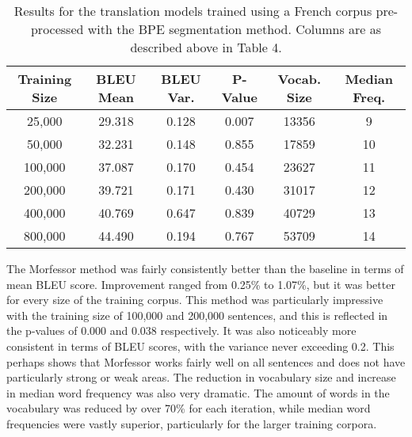 \documentclass[11pt]{article}
\begin{document}
\begin{table}[h]
\centering
\begin{tabular}{|c|c|c|c|c|c|}
\hline
Training Size & BLEU Mean & BLEU Var. & P-Value & Vocab. Size & Median Freq. \\ \hline
25,000        & 29.318    & 0.128     & 0.007   & 13356       & 9            \\
50,000        & 32.231    & 0.148     & 0.855   & 17859       & 10           \\
100,000       & 37.087    & 0.170     & 0.454   & 23627       & 11           \\
200,000       & 39.721    & 0.171     & 0.430   & 31017       & 12           \\
400,000       & 40.769    & 0.647     & 0.839   & 40729       & 13           \\
800,000       & 44.490    & 0.194     & 0.767   & 53709       & 14           \\ \hline
\end{tabular}
\caption{Results for the translation models trained using a French corpus pre-processed with the BPE segmentation method. Columns are as described above in Table 4.}
\label{tab:bpe}
\end{table}

The Morfessor method was fairly consistently better than the baseline in terms of mean BLEU score. Improvement ranged from 0.25\% to 1.07\%, but it was better for every size of the training corpus. This method was particularly impressive with the training size of 100,000 and 200,000 sentences, and this is reflected in the p-values of 0.000 and 0.038 respectively. It was also noticeably more consistent in terms of BLEU scores, with the variance never exceeding 0.2. This perhaps shows that Morfessor works fairly well on all sentences and does not have particularly strong or weak areas. The reduction in vocabulary size and increase in median word frequency was also very dramatic. The amount of words in the vocabulary was reduced by over 70\% for each iteration, while median word frequencies were vastly superior, particularly for the larger training corpora.
\end{document}
